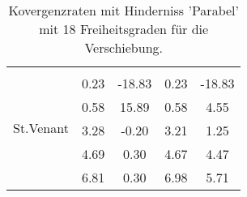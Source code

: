 \begin{table}
\begin{tabular}{c|cc|cc|}
\hline 
\multicolumn{1}{|c|}{\multirow{6}{*}{St.Venant}} &\multicolumn{1}{|c|}{} & \multicolumn{1}{|c|}{} & \multicolumn{1}{|c|}{} & \multicolumn{1}{|c|}{} \\ 
\multicolumn{1}{|c|}{} & \multicolumn{1}{|c|}{      0.23} & \multicolumn{1}{|c|}{    -18.83} & \multicolumn{1}{|c|}{      0.23} & \multicolumn{1}{|c|}{    -18.83} \\ 
\multicolumn{1}{|c|}{} & \multicolumn{1}{|c|}{      0.58} & \multicolumn{1}{|c|}{     15.89} & \multicolumn{1}{|c|}{      0.58} & \multicolumn{1}{|c|}{      4.55} \\ 
\multicolumn{1}{|c|}{} & \multicolumn{1}{|c|}{      3.28} & \multicolumn{1}{|c|}{     -0.20} & \multicolumn{1}{|c|}{      3.21} & \multicolumn{1}{|c|}{      1.25} \\ 
\multicolumn{1}{|c|}{} & \multicolumn{1}{|c|}{      4.69} & \multicolumn{1}{|c|}{      0.30} & \multicolumn{1}{|c|}{      4.67} & \multicolumn{1}{|c|}{      4.47} \\ 
\multicolumn{1}{|c|}{} & \multicolumn{1}{|c|}{      6.81} & \multicolumn{1}{|c|}{      0.30} & \multicolumn{1}{|c|}{      6.98} & \multicolumn{1}{|c|}{      5.71} \\ 
\hline 
\end{tabular}\caption{Kovergenzraten mit Hinderniss 'Parabel' mit 18 Freiheitsgraden für die Verschiebung.}\label{tab:Rate_Parabel_level0}
\end{table} 
